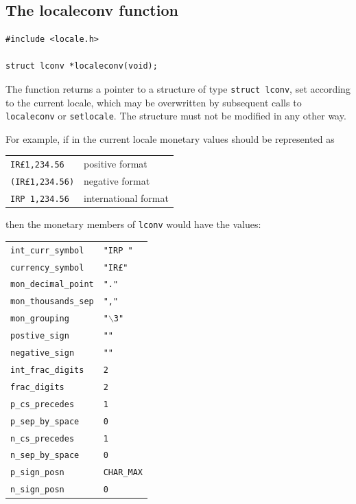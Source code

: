   

  \subsection{The localeconv function}
   

   \begin{Verbatim}
#include <locale.h>

struct lconv *localeconv(void);
\end{Verbatim}

   The function returns a pointer to a structure of type \texttt{struct
   lconv},  set  according  to  the current locale, which may be
   overwritten by subsequent calls to \texttt{localeconv} or
   \texttt{setlocale}.  The structure must not be modified in any other
   way.


   For example, if in the current locale monetary values should
   be represented as


   \begin{tabular}{ll}
     \toprule
     \texttt{IR\pounds1,234.56}   & positive format    \\
     \texttt{(IR\pounds1,234.56)} & negative format    \\
     \texttt{IRP 1,234.56}        & international format    \\
     \bottomrule
   \end{tabular}


   then the monetary members of \texttt{lconv} would have the
    values:


   \begin{tabular}{ll}
     \toprule
     \texttt{int\_curr\_symbol}   & \texttt{"IRP "}    \\
     \texttt{currency\_symbol}    & \texttt{"IR\pounds"}    \\
     \texttt{mon\_decimal\_point} & \texttt{"."}    \\
     \texttt{mon\_thousands\_sep} & \texttt{","}    \\
     \texttt{mon\_grouping}       & \texttt{"$\backslash$3"}    \\
     \texttt{postive\_sign}       & \texttt{""}    \\
     \texttt{negative\_sign}      & \texttt{""}    \\
     \texttt{int\_frac\_digits}   & \texttt{2}    \\
     \texttt{frac\_digits}        & \texttt{2}    \\
     \texttt{p\_cs\_precedes}     & \texttt{1}    \\
     \texttt{p\_sep\_by\_space}   & \texttt{0}    \\
     \texttt{n\_cs\_precedes}     & \texttt{1}    \\
     \texttt{n\_sep\_by\_space}   & \texttt{0}    \\
     \texttt{p\_sign\_posn}       & \texttt{CHAR\_MAX}    \\
     \texttt{n\_sign\_posn}       & \texttt{0}    \\
     \bottomrule
   \end{tabular}



